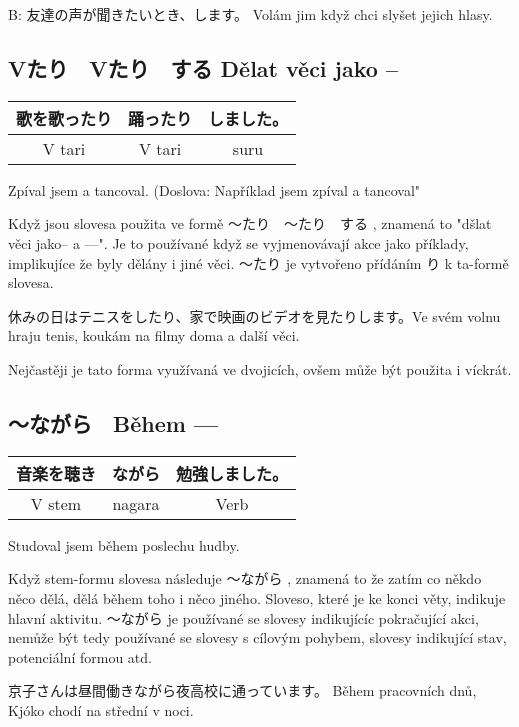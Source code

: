 B: 友達の声が聞きたいとき、します。	Volám jim když chci slyšet jejich hlasy.

\subsection{Vたり　Vたり　する Dělat věci jako --}

\begin{tabular}{||c|c|c||}
\hline
歌を歌ったり&踊ったり&しました。\\
\hline
V tari & V tari& suru\\
\hline
\end{tabular}
Zpíval jsem a tancoval. (Doslova: Například jsem zpíval a tancoval"

Když jsou slovesa použita ve formě 〜たり　〜たり　する		, znamená to "dšlat věci jako-- a ---". Je to používané když se vyjmenovávají akce jako příklady, implikujíce že byly dělány i jiné věci. 〜たり	je vytvořeno přídáním り	 k ta-formě slovesa.

休みの日はテニスをしたり、家で映画のビデオを見たりします。Ve svém volnu hraju tenis, koukám na filmy doma a další věci.

Nejčastěji je tato forma využívaná ve dvojicích, ovšem může být použita i víckrát.


\subsection{〜ながら　Během ---}

\begin{tabular}{||c|c||c||}
\hline
音楽を聴き&ながら&勉強しました。\\
\hline
V stem&nagara&Verb\\
\hline
\end{tabular}

Studoval jsem během poslechu hudby.

Když stem-formu slovesa následuje 	〜ながら	, znamená to že zatím co někdo něco dělá, dělá během toho i něco jiného. Sloveso, které je ke konci věty, indikuje hlavní aktivitu. 	〜ながら	je používané se slovesy indikujícíc pokračující akci, nemůže být tedy používané se slovesy s cílovým pohybem, slovesy indikující stav, potenciální formou atd.


京子さんは昼間働きながら夜高校に通っています。	Během pracovních dnů, Kjóko chodí na střední v noci.






















